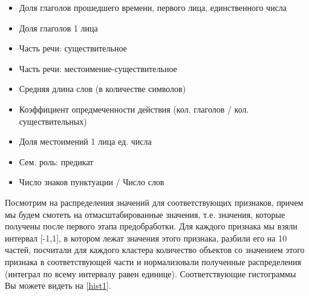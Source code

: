 \documentclass[12pt]{article}
\begin{document}
\begin{itemize}
\item Доля глаголов прошедшего времени, первого лица, единственного числа
\item Доля глаголов 1 лица
\item Часть речи: существительное
\item Часть речи: местоимение-существительное
\item Средняя длина слов (в количестве символов)
\item Коэффициент опредмеченности действия (кол. глаголов / кол. существительных)
\item Доля местоимений 1 лица ед. числа
\item Сем. роль: предикат
\item Число знаков пунктуации / Число слов
\end{itemize}


Посмотрим на распределения значений для соответствующих признаков, причем мы будем смотеть на отмасштабированные значения, т.е. значения, которые получены после первого этапа предобработки. Для каждого признака мы взяли интервал [-1,1], в котором лежат значения этого признака, разбили его на 10 частей, посчитали для каждого кластера количество объектов со значением этого признака в соответствующей части и нормализовали полученные распределения (интеграл по всему интервалу равен единице). Соответствующие гистограммы Вы можете видеть на \ref{hist1}.
\end{document}
